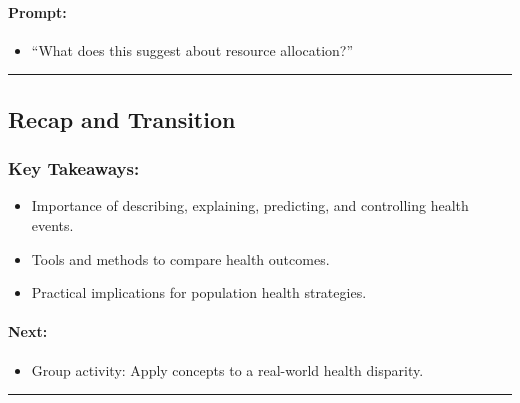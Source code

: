 \documentclass[
  letterpaper,
  DIV=11,
  numbers=noendperiod]{scrartcl}
\let\oldparagraph\paragraph
\renewcommand{\paragraph}[1]{\oldparagraph{#1}\mbox{}}
\providecommand{\tightlist}{%
  \setlength{\itemsep}{0pt}\setlength{\parskip}{0pt}}\usepackage{longtable,booktabs,array}
\begin{document}
\hypertarget{prompt}{%
\paragraph{Prompt:}\label{prompt}}

\begin{itemize}
\tightlist
\item
  ``What does this suggest about resource allocation?''
\end{itemize}

\begin{center}\rule{0.5\linewidth}{0.5pt}\end{center}

\hypertarget{recap-and-transition}{%
\subsection{\texorpdfstring{{\textbf{Recap and
Transition}}}{Recap and Transition}}\label{recap-and-transition}}

\hypertarget{key-takeaways}{%
\subsubsection{\texorpdfstring{{\textbf{Key
Takeaways}}:}{Key Takeaways:}}\label{key-takeaways}}

\begin{itemize}
\tightlist
\item
  Importance of describing, explaining, predicting, and controlling
  health events.\\
\item
  Tools and methods to compare health outcomes.\\
\item
  Practical implications for population health strategies.
\end{itemize}

\hypertarget{next}{%
\paragraph{Next:}\label{next}}

\begin{itemize}
\tightlist
\item
  Group activity: Apply concepts to a real-world health disparity.
\end{itemize}

\begin{center}\rule{0.5\linewidth}{0.5pt}\end{center}
\end{document}
